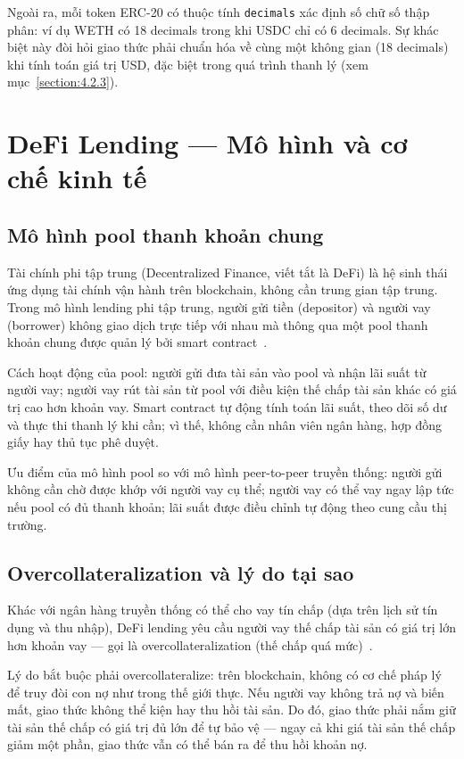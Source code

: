 \documentclass[../DoAn.tex]{subfiles}
\begin{document}
Ngoài ra, mỗi token ERC-20 có thuộc tính \texttt{decimals} xác định số chữ số thập phân: ví dụ WETH có 18 decimals trong khi USDC chỉ có 6 decimals. Sự khác biệt này đòi hỏi giao thức phải chuẩn hóa về cùng một không gian (18 decimals) khi tính toán giá trị USD, đặc biệt trong quá trình thanh lý (xem mục~\ref{section:4.2.3}).

\section{DeFi Lending --- Mô hình và cơ chế kinh tế}


\subsection{Mô hình pool thanh khoản chung}


Tài chính phi tập trung (Decentralized Finance, viết tắt là DeFi) là hệ sinh thái ứng dụng tài chính vận hành trên blockchain, không cần trung gian tập trung. Trong mô hình lending phi tập trung, người gửi tiền (depositor) và người vay (borrower) không giao dịch trực tiếp với nhau mà thông qua một pool thanh khoản chung được quản lý bởi smart contract~\cite{Gudgeon2020DeFi}.

Cách hoạt động của pool: người gửi đưa tài sản vào pool và nhận lãi suất từ người vay; người vay rút tài sản từ pool với điều kiện thế chấp tài sản khác có giá trị cao hơn khoản vay. Smart contract tự động tính toán lãi suất, theo dõi số dư và thực thi thanh lý khi cần; vì thế, không cần nhân viên ngân hàng, hợp đồng giấy hay thủ tục phê duyệt.

Ưu điểm của mô hình pool so với mô hình peer-to-peer truyền thống: người gửi không cần chờ được khớp với người vay cụ thể; người vay có thể vay ngay lập tức nếu pool có đủ thanh khoản; lãi suất được điều chỉnh tự động theo cung cầu thị trường.

\subsection{Overcollateralization và lý do tại sao}


Khác với ngân hàng truyền thống có thể cho vay tín chấp (dựa trên lịch sử tín dụng và thu nhập), DeFi lending yêu cầu người vay thế chấp tài sản có giá trị lớn hơn khoản vay --- gọi là overcollateralization (thế chấp quá mức)~\cite{Gudgeon2020DeFi}.

Lý do bắt buộc phải overcollateralize: trên blockchain, không có cơ chế pháp lý để truy đòi con nợ như trong thế giới thực. Nếu người vay không trả nợ và biến mất, giao thức không thể kiện hay thu hồi tài sản. Do đó, giao thức phải nắm giữ tài sản thế chấp có giá trị đủ lớn để tự bảo vệ --- ngay cả khi giá tài sản thế chấp giảm một phần, giao thức vẫn có thể bán ra để thu hồi khoản nợ.
\end{document}
